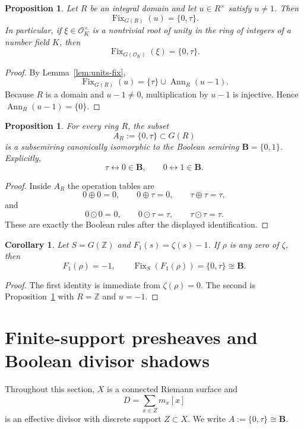 \documentclass[11pt,a4paper]{article}
\numberwithin{equation}{section}
\newtheorem{proposition}[theorem]{Proposition}
\newtheorem{corollary}[theorem]{Corollary}
\theoremstyle{definition}
\theoremstyle{remark}
\DeclareMathOperator{\Fix}{Fix}
\DeclareMathOperator{\Ann}{Ann}
\newcommand{\ZZ}{\mathbb Z}
\newcommand{\BB}{\mathbf B}
\newcommand{\cO}{\mathcal O}
\newcommand{\taup}{\tau}
\begin{document}
\begin{proposition}\label{prop:split-root-domain}
Let $R$ be an integral domain and let $u\in R^\times$ satisfy $u\neq1$.  Then
\[
\Fix_{G(R)}(u)=\{0,\taup\}.
\]
In particular, if $\xi\in\cO_K^\times$ is a nontrivial root of unity in the ring of integers of a number field $K$, then
\[
\Fix_{G(\cO_K)}(\xi)=\{0,\taup\}.
\]
\end{proposition}

\begin{proof}
By Lemma~\ref{lem:units-fix},
\[
\Fix_{G(R)}(u)=\{\taup\}\cup\Ann_R(u-1).
\]
Because $R$ is a domain and $u-1\neq0$, multiplication by $u-1$ is injective.  Hence $\Ann_R(u-1)=\{0\}$.
\end{proof}

\begin{proposition}\label{prop:boolean-pair}
For every ring $R$, the subset
\[
A_R:=\{0,\taup\}\subset G(R)
\]
is a subsemiring canonically isomorphic to the Boolean semiring $\BB=\{0,1\}$.  Explicitly,
\[
\taup\longleftrightarrow 0\in\BB,
\qquad
0\longleftrightarrow 1\in\BB.
\]
\end{proposition}

\begin{proof}
Inside $A_R$ the operation tables are
\[
0\oplus0=0,\qquad 0\oplus\taup=0,\qquad \taup\oplus\taup=\taup,
\]
and
\[
0\odot0=0,\qquad 0\odot\taup=\taup,\qquad \taup\odot\taup=\taup.
\]
These are exactly the Boolean rules after the displayed identification.
\end{proof}

\begin{corollary}\label{cor:zeta-pointwise}
Let $S=G(\ZZ)$ and $F_1(s)=\zeta(s)-1$.  If $\rho$ is any zero of $\zeta$, then
\[
F_1(\rho)=-1,
\qquad
\Fix_S(F_1(\rho))=\{0,\taup\}\cong\BB.
\]
\end{corollary}

\begin{proof}
The first identity is immediate from $\zeta(\rho)=0$.  The second is Proposition~\ref{prop:split-root-domain} with $R=\ZZ$ and $u=-1$.
\end{proof}

\section{Finite-support presheaves and Boolean divisor shadows}

Throughout this section, $X$ is a connected Riemann surface and
\[
D=\sum_{x\in Z}m_x[x]
\]
is an effective divisor with discrete support $Z\subset X$.  We write $A:=\{0,\taup\}\cong\BB$.
\end{document}
